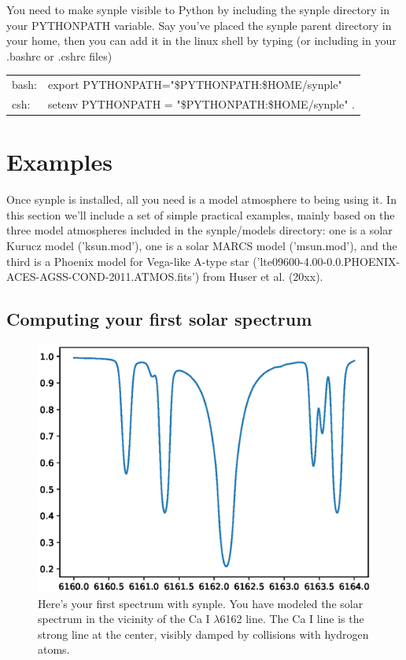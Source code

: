 \documentclass[]{article}
\begin{document}
You need to make synple visible to Python by including the synple directory in your PYTHONPATH variable. Say you've placed the synple parent directory in your home, then you can add it in the linux shell by typing (or including in your .bashrc or .cshrc files)
\begin{table}[h]
\begin{tabular}{ll}
bash: & export PYTHONPATH="\$PYTHONPATH:\$HOME/synple"  \\
csh:  & setenv PYTHONPATH = "\$PYTHONPATH:\$HOME/synple" .
\end{tabular}
\end{table}


\section{Examples}

Once synple is installed, all you need is a model atmosphere to being using it. In this section we'll include a set of simple practical examples, mainly based on the three model atmospheres included in the synple/models directory: one is a solar Kurucz model ('ksun.mod'), one is a solar MARCS model ('msun.mod'), and the third is a Phoenix model for Vega-like A-type star ('lte09600-4.00-0.0.PHOENIX-ACES-AGSS-COND-2011.ATMOS.fits') from Huser et al. (20xx).


\subsection{Computing your first solar spectrum}
\label{6162}


\begin{figure}[t!]
\centering
\includegraphics[width=14cm]{Figure_1.ps}
\caption{Here's your first spectrum with synple. You have modeled the solar spectrum in the vicinity of the Ca I $\lambda$6162 line. The Ca I line is the strong line at the center, visibly damped by collisions with hydrogen atoms.
\label{first}
}
\end{figure}
\end{document}
